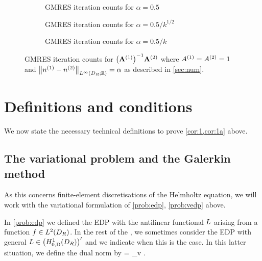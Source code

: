   \begin{figure}
    \centering
    \begin{subfigure}{\textwidth}
      \centering

\caption{GMRES iteration counts for $\alpha = 0.5$}\label{fig:linfinityn0}
    \end{subfigure}
    
    \begin{subfigure}{\textwidth}
      \centering

  \caption{GMRES iteration counts for $\alpha = 0.5/k^{1/2}$}\label{fig:linfinityn1}
\end{subfigure}

    \begin{subfigure}{\textwidth}
      \centering

  \caption{GMRES iteration counts for $\alpha = 0.5/k$}\label{fig:linfinityn2}
\end{subfigure}
\caption{GMRES iteration counts for $\AmatoI\Amatt$ where ${A}^{(1)}={A}^{(2)}=1$ and $\NLiDRRR{\nso-\nst} = \alpha$ as described in \cref{sec:num}.}
\end{figure}



\section{Definitions and conditions}\label{sec:3}

We now state the necessary technical definitions to prove \cref{cor:1,cor:1a} above.

\subsection{The variational problem and the Galerkin method}\label{sec:vpGm}
As this  concerns finite-element discretisations of the Helmholtz equation, we will work with the variational formulation of \cref{prob:edp}, \cref{prob:vedp} above.

In \cref{prob:edp} we defined the EDP with the antilinear functional $L$ arising from a function $f\in \LtDR$. In the rest of the , 
we sometimes consider the EDP with general $\LE\in \HozDDRp$ and we indicate when this is the case.
In this latter situation, we define the dual norm by
\beq\label{eq:dualnorm}
= \sup_{v\in \HozDDR} .
\eeq
\ere

